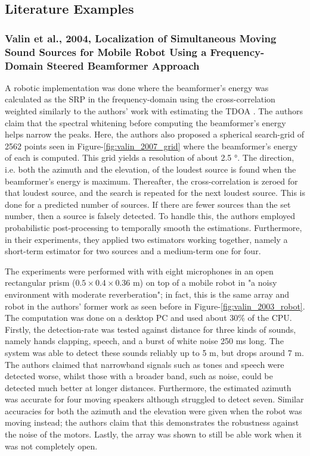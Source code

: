 \documentclass[notitlepage]{report}
\begin{document}
\subsection{Literature Examples}

\subsubsection{Valin et al., 2004, Localization of Simultaneous Moving Sound Sources for Mobile Robot Using a Frequency- Domain Steered Beamformer Approach}

A robotic implementation \cite{valin_localization_2004} was done where the beamformer's energy was calculated as the SRP in the frequency-domain using the cross-correlation weighted similarly to the authors' work with estimating the TDOA \cite{valin_robust_2003}. The authors claim that the spectral whitening before computing the beamformer's energy helps narrow the peaks. Here, the authors also proposed a spherical search-grid of 2562 points seen in Figure-\ref{fig:valin_2007_grid} where the beamformer's energy of each is computed. This grid yields a resolution of about 2.5 \si{\degree}. The direction, i.e. both the azimuth and the elevation, of the loudest source is found when the beamformer's energy is maximum. Thereafter, the cross-correlation is zeroed for that loudest source, and the search is repeated for the next loudest source. This is done for a predicted number of sources. If there are fewer sources than the set number, then a source is falsely detected. To handle this, the authors employed probabilistic post-processing to temporally smooth the estimations. Furthermore, in their experiments, they applied two estimators working together, namely a short-term estimator for two sources and a medium-term one for four. 

The experiments were performed with with eight microphones in an open rectangular prism ($0.5\times 0.4\times 0.36$ \si{m}) on top of a mobile robot in "a noisy environment with moderate reverberation"; in fact, this is the same array and robot in the authors' former work \cite{valin_robust_2003} as seen before in Figure-\ref{fig:valin_2003_robot}. The computation was done on a desktop PC and used about 30\% of the CPU. Firstly, the detection-rate was tested against distance for three kinds of sounds, namely hands clapping, speech, and a burst of white noise 250 \si{ms} long. The system was able to detect these sounds reliably up to 5 \si{m}, but drops around 7 \si{m}. The authors claimed that narrowband signals such as tones and speech were detected worse, whilst those with a broader band, such as noise, could be detected much better at longer distances. Furthermore, the estimated azimuth was accurate for four moving speakers although struggled to detect seven. Similar accuracies for both the azimuth and the elevation were given when the robot was moving instead; the authors claim that this demonstrates the robustness against the noise of the motors. Lastly, the array was shown to still be able work when it was not completely open.
\end{document}
